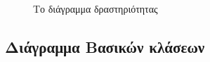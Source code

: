 \documentclass{assignment}
\begin{document}
\begin{figure}
\begin{center}
\caption{Το διάγραμμα δραστηριότητας}
\label{fig:activity_diagramm}
\end{center}
\end{figure}

\subsection{Διάγραμμα Βασικών κλάσεων}
\end{document}
